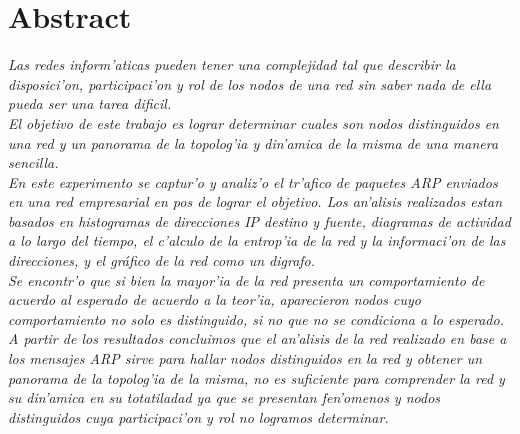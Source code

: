 \documentclass[a4paper,10pt]{article}
\begin{document}

\begin{titlepage}
\maketitle
\thispagestyle{empty}
\end{titlepage} 

\pagebreak
\tableofcontents

\pagebreak
\listoffigures

\pagebreak
\thispagestyle{fancy}

\section*{\centering Abstract}
{\em
Las redes inform'aticas pueden tener una complejidad tal que describir la disposici'on, participaci'on y rol de los nodos de una red sin saber nada de ella pueda ser una tarea dificil.	\\
\indent	El objetivo de este trabajo es lograr determinar cuales son nodos distinguidos en una red y un panorama de la topolog'ia y din'amica de la misma de una manera sencilla.	\\
\indent	En este experimento se captur'o y analiz'o el tr'afico de paquetes ARP enviados en una red empresarial en pos de lograr el objetivo. Los an'alisis realizados estan basados en histogramas de direcciones IP destino y fuente, diagramas de actividad a lo largo del tiempo, el c'alculo de la entrop'ia de la red y la informaci'on de las direcciones, y el gráfico de la red como un digrafo.	\\
\indent	Se encontr'o que si bien la mayor'ia de la red presenta un comportamiento de acuerdo al esperado de acuerdo a la teor'ia, aparecieron nodos cuyo comportamiento no solo es distinguido, si no que no se condiciona a lo esperado.	\\
\indent	A partir de los resultados concluimos que el an'alisis de la red realizado en base a los mensajes ARP sirve para hallar nodos distinguidos en la red y obtener un panorama de la topolog'ia de la misma, no es suficiente para comprender la red y su din'amica en su totatiladad ya que se presentan fen'omenos y nodos distinguidos cuya participaci'on y rol no logramos determinar.
}
\vspace*{5 mm}
\end{document}
